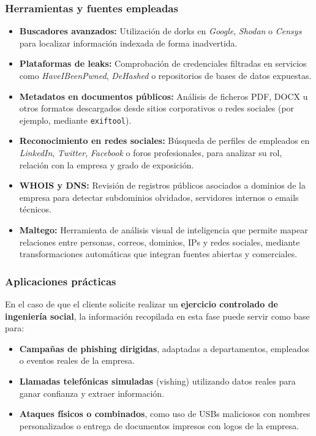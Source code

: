 \documentclass[a4paper, 11pt]{article}
\begin{document}
\vspace{0.5cm}
\subsubsection*{Herramientas y fuentes empleadas}

\begin{itemize}
    \item \textbf{Buscadores avanzados:} Utilización de dorks en \textit{Google}, \textit{Shodan} o \textit{Censys} para localizar información indexada de forma inadvertida.
    \item \textbf{Plataformas de leaks:} Comprobación de credenciales filtradas en servicios como \textit{HaveIBeenPwned}, \textit{DeHashed} o repositorios de bases de datos expuestas.
    \item \textbf{Metadatos en documentos públicos:} Análisis de ficheros PDF, DOCX u otros formatos descargados desde sitios corporativos o redes sociales (por ejemplo, mediante \texttt{exiftool}).
    \item \textbf{Reconocimiento en redes sociales:} Búsqueda de perfiles de empleados en \textit{LinkedIn}, \textit{Twitter}, \textit{Facebook} o foros profesionales, para analizar su rol, relación con la empresa y grado de exposición.
    \item \textbf{WHOIS y DNS:} Revisión de registros públicos asociados a dominios de la empresa para detectar subdominios olvidados, servidores internos o emails técnicos.
    \item \textbf{Maltego:} Herramienta de análisis visual de inteligencia que permite mapear relaciones entre personas, correos, dominios, IPs y redes sociales, mediante transformaciones automáticas que integran fuentes abiertas y comerciales.
\end{itemize}

\vspace{0.5cm}
\subsubsection*{Aplicaciones prácticas}

En el caso de que el cliente solicite realizar un \textbf{ejercicio controlado de ingeniería social}, la información recopilada en esta fase puede servir como base para:

\begin{itemize}
    \item \textbf{Campañas de phishing dirigidas}, adaptadas a departamentos, empleados o eventos reales de la empresa.
    \item \textbf{Llamadas telefónicas simuladas} (vishing) utilizando datos reales para ganar confianza y extraer información.
    \item \textbf{Ataques físicos o combinados}, como uso de USBs maliciosos con nombres personalizados o entrega de documentos impresos con logos de la empresa.
\end{itemize}
\end{document}
